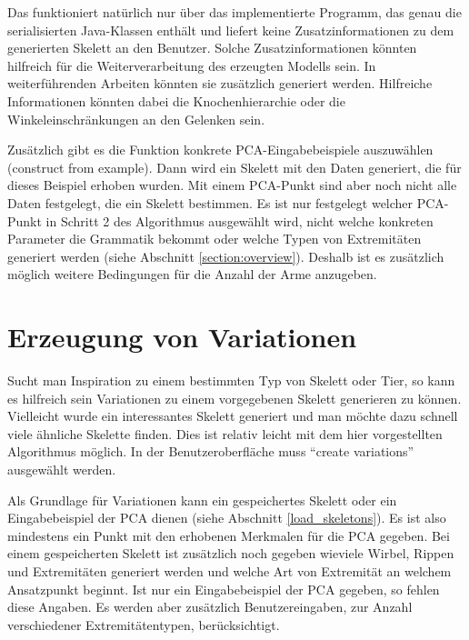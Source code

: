 Das funktioniert natürlich nur über das implementierte Programm, das genau die serialisierten Java-Klassen enthält und liefert keine Zusatzinformationen zu dem generierten Skelett an den Benutzer. Solche Zusatzinformationen könnten hilfreich für die Weiterverarbeitung des erzeugten Modells sein. In weiterführenden Arbeiten könnten sie zusätzlich generiert werden. Hilfreiche Informationen könnten dabei \zb die Knochenhierarchie oder die Winkeleinschränkungen an den Gelenken sein.

Zusätzlich gibt es die Funktion konkrete PCA-Eingabebeispiele auszuwählen (construct from example). Dann wird ein Skelett mit den Daten generiert, die für dieses Beispiel erhoben wurden. Mit einem PCA-Punkt sind aber noch nicht alle Daten festgelegt, die ein Skelett bestimmen. Es ist nur festgelegt welcher PCA-Punkt in Schritt 2 des Algorithmus ausgewählt wird, nicht welche konkreten Parameter die Grammatik bekommt oder welche Typen von Extremitäten generiert werden (siehe Abschnitt \ref{section:overview}). Deshalb ist es zusätzlich möglich weitere Bedingungen \zb für die Anzahl der Arme anzugeben.


\section{Erzeugung von Variationen}

Sucht man Inspiration zu einem bestimmten Typ von Skelett oder Tier, so kann es hilfreich sein Variationen zu einem vorgegebenen Skelett generieren zu können. 
Vielleicht wurde ein interessantes Skelett generiert und man möchte dazu schnell viele ähnliche Skelette finden.
Dies ist relativ leicht mit dem hier vorgestellten Algorithmus möglich. In der Benutzeroberfläche muss "`create variations"' ausgewählt werden.

Als Grundlage für Variationen kann ein gespeichertes Skelett oder ein Eingabebeispiel der PCA dienen (siehe Abschnitt \ref{load_skeletons}). Es ist also mindestens ein Punkt mit den erhobenen Merkmalen für die PCA gegeben. Bei einem gespeicherten Skelett ist zusätzlich noch gegeben wieviele Wirbel, Rippen und Extremitäten generiert werden und welche Art von Extremität an welchem Ansatzpunkt beginnt.
Ist nur ein Eingabebeispiel der PCA gegeben, so fehlen diese Angaben. Es werden aber zusätzlich Benutzereingaben, \zb zur Anzahl verschiedener Extremitätentypen, berücksichtigt.

